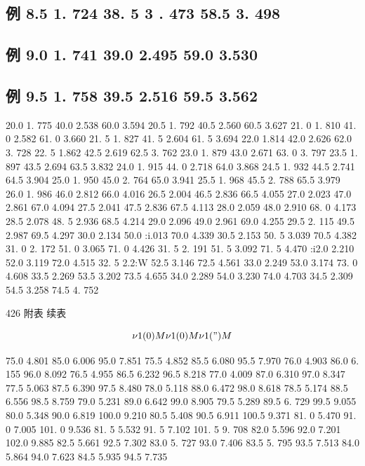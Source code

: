 \subsection*{例 8.5  1. 724 38. 5 3 . 473 58.5 3. 498}

\subsection*{例 9.0  1. 741 39.0 2.495 59.0 3.530}

\subsection*{例 9.5  1. 758 39.5 2.516 59.5 3.562}

20.0 1. 775 40.0 2.538 60.0 3.594 20.5 1. 792 40.5 2.560 60.5 3.627 21. 0 1. 810 41. 0 2.582 61. 0 3.660 21. 5 1. 827 41. 5 2.604 61. 5 3.694 22.0 1.814 42.0 2.626 62.0 3. 728 22. 5 1.862 42.5 2.619 62.5 3. 762 23.0 1. 879 43.0 2.671 63. 0 3. 797 23.5 1. 897 43.5 2.694 63.5 3.832 24.0 1. 915 44. 0 2.718 64.0 3.868 24.5 1. 932 44.5 2.741 64.5 3.904 25.0 1. 950 45.0 2. 764 65.0 3.941 25.5 1. 968 45.5 2. 788 65.5 3.979 26.0 1. 986 46.0 2.812 66.0 4.016 26.5 2.004 46.5 2.836 66.5 4.055 27.0 2.023 47.0 2.861 67.0 4.094 27.5 2.041 47.5 2.836 67.5 4.113 28.0 2.059 48.0 2.910 68. 0 4.173 28.5 2.078 48. 5 2.936 68.5 4.214 29.0 2.096 49.0 2.961 69.0 4.255 29.5 2. 115 49.5 2.987 69.5 4.297 30.0 2.134 50.0 :i.013 70.0 4.339 30.5 2.153 50. 5 3.039 70.5 4.382 31. 0 2. 172 51. 0 3.065 71. 0 4.426 31. 5 2. 191 51. 5 3.092 71. 5 4.470 :i2.0 2.210 52.0 3.119 72.0 4.515 32. 5 2.2:W 52.5 3.146 72.5 4.561 33.0 2.249 53.0 3.174 73. 0 4.608 33.5 2.269 53.5 3.202 73.5 4.655 34.0 2.289 54.0 3.230 74.0 4.703 34.5 2.309 54.5 3.258 74.5 4. 752

426 附表 续表

\[\nu 1(0) M \nu  1 (0) M \nu 1(") M\]

75.0 4.801 85.0 6.006 95.0 7.851 75.5 4.852 85.5 6.080 95.5 7.970 76.0 4.903 86.0 6. 155 96.0 8.092 76.5 4.955 86.5 6.232 96.5 8.218 77.0 4.009 87.0 6.310 97.0 8.347 77.5 5.063 87.5 6.390 97.5 8.480 78.0 5.118 88.0 6.472 98.0 8.618 78.5 5.174 88.5 6.556 98.5 8.759 79.0 5.231 89.0 6.642 99.0 8.905 79.5 5.289 89.5 6. 729 99.5 9.055 80.0 5.348 90.0 6.819 100.0 9.210 80.5 5.408 90.5 6.911 100.5 9.371 81. 0 5.470 91. 0 7.005 101. 0 9.536 81. 5 5.532 91. 5 7.102 101. 5 9. 708 82.0 5.596 92.0 7.201 102.0 9.885 82.5 5.661 92.5 7.302 83.0 5. 727 93.0 7.406 83.5 5. 795 93.5 7.513 84.0 5.864 94.0 7.623 84.5 5.935 94.5 7.735

